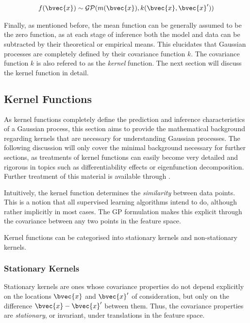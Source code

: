 				\begin{equation}
					f(\bvec{x}) \sim \mathcal{GP}(m(\bvec{x}), k(\bvec{x}, \bvec{x}'))
				\label{Equation:GaussianRandomFieldProcess}
				\end{equation}	
							
			Finally, as mentioned before, the mean function can be generally assumed to be the zero function, as at each stage of inference both the model and data can be subtracted by their theoretical or empirical means. This elucidates that Gaussian processes are completely defined by their covariance function $k$. The covariance function $k$ is also refered to as the \textit{kernel} function. The next section will discuss the kernel function in detail.
			
			\FloatBarrier
			
		\subsection{Kernel Functions}
		\label{Background:GaussianProcesses:KernelFunctions}

			As kernel functions completely define the prediction and inference characteristics of a Gaussian process, this section aims to provide the mathematical background regarding kernels that are necessary for understanding Gaussian processes. The following discussion will only cover the minimal background necessary for further sections, as treatments of kernel functions can easily become very detailed and rigorous in topics such as differentiability effects or eigenfunction decomposition. Further treatment of this material is available through \cite{GaussianProcessForMachineLearning}. 
			
			Intuitively, the kernel function determines the \textit{similarity} between data points. This is a notion that all supervised learning algorithms intend to do, although rather implicitly in most cases. The GP formulation makes this explicit through the covariance between any two points in the feature space.
			
			Kernel functions can be categorised into stationary kernels and non-stationary kernels.
						
			\subsubsection{Stationary Kernels}
			\label{Background:GaussianProcesses:KernelFunctions:Stationary}
			
				Stationary kernels are ones whose covariance properties do not depend explicitly on the locations $\bvec{x}$ and $\bvec{x}'$ of consideration, but only on the difference $\bvec{x} - \bvec{x}'$ between them. Thus, the covariance properties are \textit{stationary}, or invariant, under translations in the feature space.
				
